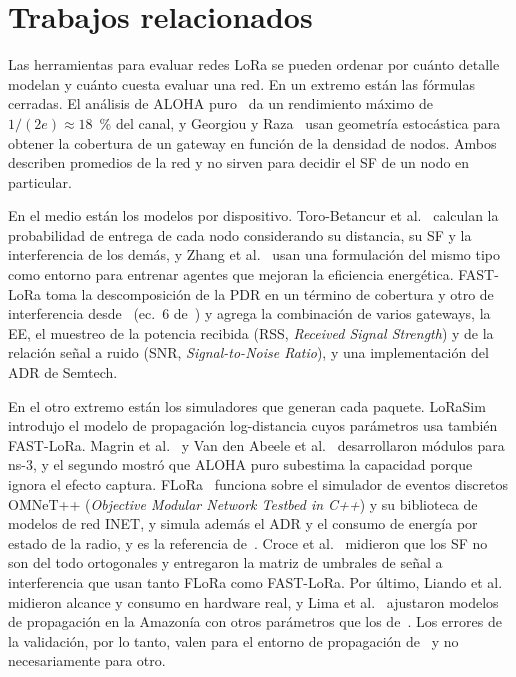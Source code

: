 \documentclass[conference,a4paper]{IEEEtran}
\begin{document}
\section{Trabajos relacionados}

Las herramientas para evaluar redes LoRa se pueden ordenar por cuánto detalle modelan y cuánto cuesta evaluar una red. En un extremo están las fórmulas cerradas. El análisis de ALOHA puro~\cite{abramson} da un rendimiento máximo de $1/(2e)\approx18$~\% del canal, y Georgiou y Raza~\cite{georgiou} usan geometría estocástica para obtener la cobertura de un gateway en función de la densidad de nodos. Ambos describen promedios de la red y no sirven para decidir el SF de un nodo en particular.

En el medio están los modelos por dispositivo. Toro-Betancur et al.~\cite{toro} calculan la probabilidad de entrega de cada nodo considerando su distancia, su SF y la interferencia de los demás, y Zhang et al.~\cite{zhang} usan una formulación del mismo tipo como entorno para entrenar agentes que mejoran la eficiencia energética. FAST-LoRa toma la descomposición de la PDR en un término de cobertura y otro de interferencia desde~\cite{zhang} (ec.~6 de~\cite{fastlora}) y agrega la combinación de varios gateways, la EE, el muestreo de la potencia recibida (RSS, \emph{Received Signal Strength}) y de la relación señal a ruido (SNR, \emph{Signal-to-Noise Ratio}), y una implementación del ADR de Semtech.

En el otro extremo están los simuladores que generan cada paquete. LoRaSim~\cite{bor} introdujo el modelo de propagación log-distancia cuyos parámetros usa también FAST-LoRa. Magrin et al.~\cite{magrin} y Van den Abeele et al.~\cite{vandenabeele} desarrollaron módulos para ns-3, y el segundo mostró que ALOHA puro subestima la capacidad porque ignora el efecto captura. FLoRa~\cite{flora} funciona sobre el simulador de eventos discretos OMNeT++ (\emph{Objective Modular Network Testbed in C++}) y su biblioteca de modelos de red INET, y simula además el ADR y el consumo de energía por estado de la radio, y es la referencia de~\cite{fastlora}. Croce et al.~\cite{croce} midieron que los SF no son del todo ortogonales y entregaron la matriz de umbrales de señal a interferencia que usan tanto FLoRa como FAST-LoRa. Por último, Liando et al.~\cite{liando} midieron alcance y consumo en hardware real, y Lima et al.~\cite{lima} ajustaron modelos de propagación en la Amazonía con otros parámetros que los de~\cite{bor}. Los errores de la validación, por lo tanto, valen para el entorno de propagación de~\cite{bor} y no necesariamente para otro.
\end{document}
